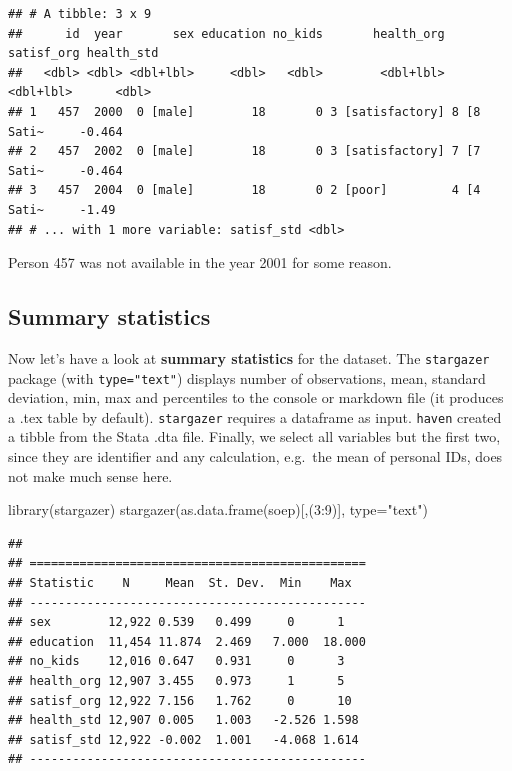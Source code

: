 \documentclass[
]{book}
\newenvironment{Shaded}{\begin{snugshade}}{\end{snugshade}}
\newcommand{\AttributeTok}[1]{\textcolor[rgb]{0.77,0.63,0.00}{#1}}
\newcommand{\DecValTok}[1]{\textcolor[rgb]{0.00,0.00,0.81}{#1}}
\newcommand{\FunctionTok}[1]{\textcolor[rgb]{0.00,0.00,0.00}{#1}}
\newcommand{\NormalTok}[1]{#1}
\newcommand{\SpecialCharTok}[1]{\textcolor[rgb]{0.00,0.00,0.00}{#1}}
\newcommand{\StringTok}[1]{\textcolor[rgb]{0.31,0.60,0.02}{#1}}
\begin{document}
\begin{verbatim}
## # A tibble: 3 x 9
##      id  year       sex education no_kids       health_org satisf_org health_std
##   <dbl> <dbl> <dbl+lbl>     <dbl>   <dbl>        <dbl+lbl>  <dbl+lbl>      <dbl>
## 1   457  2000  0 [male]        18       0 3 [satisfactory] 8 [8 Sati~     -0.464
## 2   457  2002  0 [male]        18       0 3 [satisfactory] 7 [7 Sati~     -0.464
## 3   457  2004  0 [male]        18       0 2 [poor]         4 [4 Sati~     -1.49 
## # ... with 1 more variable: satisf_std <dbl>
\end{verbatim}

Person 457 was not available in the year 2001 for some reason.

\hypertarget{summary-statistics}{%
\subsection{Summary statistics}\label{summary-statistics}}

Now let's have a look at \textbf{summary statistics} for the dataset. The \texttt{stargazer} package (with \texttt{type="text"}) displays number of observations, mean, standard deviation, min, max and percentiles to the console or markdown file (it produces a .tex table by default). \texttt{stargazer} requires a dataframe as input. \texttt{haven} created a tibble from the Stata .dta file. Finally, we select all variables but the first two, since they are identifier and any calculation, e.g.~the mean of personal IDs, does not make much sense here.

\begin{Shaded}
\begin{Highlighting}[]
\FunctionTok{library}\NormalTok{(stargazer)}
\FunctionTok{stargazer}\NormalTok{(}\FunctionTok{as.data.frame}\NormalTok{(soep)[,(}\DecValTok{3}\SpecialCharTok{:}\DecValTok{9}\NormalTok{)], }\AttributeTok{type=}\StringTok{"text"}\NormalTok{)}
\end{Highlighting}
\end{Shaded}

\begin{verbatim}
## 
## ===============================================
## Statistic    N     Mean  St. Dev.  Min    Max  
## -----------------------------------------------
## sex        12,922 0.539   0.499     0      1   
## education  11,454 11.874  2.469   7.000  18.000
## no_kids    12,016 0.647   0.931     0      3   
## health_org 12,907 3.455   0.973     1      5   
## satisf_org 12,922 7.156   1.762     0      10  
## health_std 12,907 0.005   1.003   -2.526 1.598 
## satisf_std 12,922 -0.002  1.001   -4.068 1.614 
## -----------------------------------------------
\end{verbatim}
\end{document}
